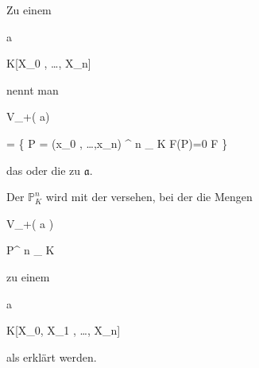 {


Zu einem


\mavergleichskette

{\vergleichskette

{ {\mathfrak a}
}

{ \subseteq }{ K[X_0 , \ldots , X_n]
}

{  }{
}

{    }{
}

{   }{
}

}
{}{}{}
nennt man


\mavergleichskettedisphandlinks

{\vergleichskettedisphandlinks

{ V_+( {\mathfrak a})
}

{ =} { \left\{ P = (x_0 , \ldots ,x_n) ^{ n }_{ K }   \mid   F(P)=0    F          \right\}
}

{ } {
}

{ } {
}

{ } {
}

}
{}{}{}
das  oder die  zu ${\mathfrak a}$.


}



{}

{


Der
${\mathbb P}^{ n }_{ K}$ wird mit der  versehen, bei der die Mengen


\mavergleichskette

{\vergleichskette

{ V_+( {\mathfrak a} )
}

{ \subseteq }{ {\mathbb P}^{ n }_{ K}
}

{  }{
}

{    }{
}

{   }{
}

}
{}{}{}
zu einem


\mavergleichskette

{\vergleichskette

{ {\mathfrak a}
}

{ \subseteq }{  K[X_0, X_1 , \ldots , X_n]
}

{  }{
}

{    }{
}

{   }{
}

}
{}{}{}
als
erklärt werden.


}


